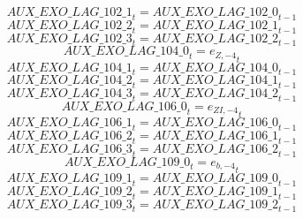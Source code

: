 \begin{dmath}
{AUX\_EXO\_LAG\_102\_1}_{t}={AUX\_EXO\_LAG\_102\_0}_{t-1}
\end{dmath}
\begin{dmath}
{AUX\_EXO\_LAG\_102\_2}_{t}={AUX\_EXO\_LAG\_102\_1}_{t-1}
\end{dmath}
\begin{dmath}
{AUX\_EXO\_LAG\_102\_3}_{t}={AUX\_EXO\_LAG\_102\_2}_{t-1}
\end{dmath}
\begin{dmath}
{AUX\_EXO\_LAG\_104\_0}_{t}={{e_{Z,-4}}}_{t}
\end{dmath}
\begin{dmath}
{AUX\_EXO\_LAG\_104\_1}_{t}={AUX\_EXO\_LAG\_104\_0}_{t-1}
\end{dmath}
\begin{dmath}
{AUX\_EXO\_LAG\_104\_2}_{t}={AUX\_EXO\_LAG\_104\_1}_{t-1}
\end{dmath}
\begin{dmath}
{AUX\_EXO\_LAG\_104\_3}_{t}={AUX\_EXO\_LAG\_104\_2}_{t-1}
\end{dmath}
\begin{dmath}
{AUX\_EXO\_LAG\_106\_0}_{t}={{e_{ZI,-4}}}_{t}
\end{dmath}
\begin{dmath}
{AUX\_EXO\_LAG\_106\_1}_{t}={AUX\_EXO\_LAG\_106\_0}_{t-1}
\end{dmath}
\begin{dmath}
{AUX\_EXO\_LAG\_106\_2}_{t}={AUX\_EXO\_LAG\_106\_1}_{t-1}
\end{dmath}
\begin{dmath}
{AUX\_EXO\_LAG\_106\_3}_{t}={AUX\_EXO\_LAG\_106\_2}_{t-1}
\end{dmath}
\begin{dmath}
{AUX\_EXO\_LAG\_109\_0}_{t}={{e_{b,-4}}}_{t}
\end{dmath}
\begin{dmath}
{AUX\_EXO\_LAG\_109\_1}_{t}={AUX\_EXO\_LAG\_109\_0}_{t-1}
\end{dmath}
\begin{dmath}
{AUX\_EXO\_LAG\_109\_2}_{t}={AUX\_EXO\_LAG\_109\_1}_{t-1}
\end{dmath}
\begin{dmath}
{AUX\_EXO\_LAG\_109\_3}_{t}={AUX\_EXO\_LAG\_109\_2}_{t-1}
\end{dmath}
